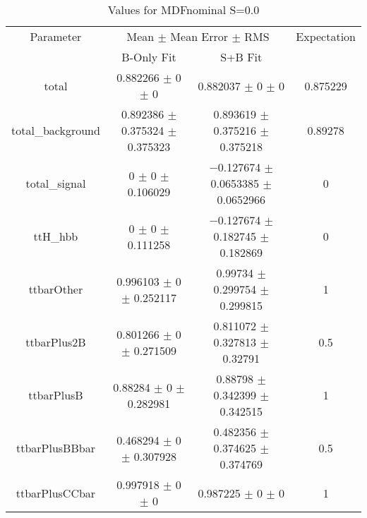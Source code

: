 \begin{table}
\centering
\caption{Values for MDFnominal S=0.0}
\begin{tabular}{cccc}
\toprule
Parameter & \multicolumn{2}{c}{Mean $\pm$ Mean Error $\pm$ RMS} & Expectation\\
 & B-Only Fit & S+B Fit & \\
\midrule
total & \num{0.882266} $\pm$ \num{0} $\pm$ \num{0} & \num{0.882037} $\pm$ \num{0} $\pm$ \num{0} & \num{0.875229}\\
total\_background & \num{0.892386} $\pm$ \num{0.375324} $\pm$ \num{0.375323} & \num{0.893619} $\pm$ \num{0.375216} $\pm$ \num{0.375218} & \num{0.89278}\\
total\_signal & \num{0} $\pm$ \num{0} $\pm$ \num{0.106029} & \num{-0.127674} $\pm$ \num{0.0653385} $\pm$ \num{0.0652966} & \num{0}\\
ttH\_hbb & \num{0} $\pm$ \num{0} $\pm$ \num{0.111258} & \num{-0.127674} $\pm$ \num{0.182745} $\pm$ \num{0.182869} & \num{0}\\
ttbarOther & \num{0.996103} $\pm$ \num{0} $\pm$ \num{0.252117} & \num{0.99734} $\pm$ \num{0.299754} $\pm$ \num{0.299815} & \num{1}\\
ttbarPlus2B & \num{0.801266} $\pm$ \num{0} $\pm$ \num{0.271509} & \num{0.811072} $\pm$ \num{0.327813} $\pm$ \num{0.32791} & \num{0.5}\\
ttbarPlusB & \num{0.88284} $\pm$ \num{0} $\pm$ \num{0.282981} & \num{0.88798} $\pm$ \num{0.342399} $\pm$ \num{0.342515} & \num{1}\\
ttbarPlusBBbar & \num{0.468294} $\pm$ \num{0} $\pm$ \num{0.307928} & \num{0.482356} $\pm$ \num{0.374625} $\pm$ \num{0.374769} & \num{0.5}\\
ttbarPlusCCbar & \num{0.997918} $\pm$ \num{0} $\pm$ \num{0} & \num{0.987225} $\pm$ \num{0} $\pm$ \num{0} & \num{1}\\
\bottomrule
\end{tabular}
\end{table}